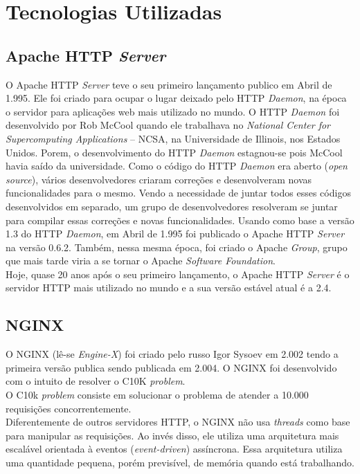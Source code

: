 \chapter{Tecnologias Utilizadas}\label{tecnologias_utilizadas}

\section{Apache HTTP \textit{Server}}
O Apache HTTP \textit{Server} teve o seu primeiro lançamento publico em Abril de 1.995. Ele foi criado para ocupar o lugar deixado pelo HTTP \textit{Daemon}, na época o servidor para aplicações web mais utilizado no mundo. O HTTP \textit{Daemon} foi desenvolvido por Rob McCool quando ele trabalhava no \textit{National Center for Supercomputing Applications} – NCSA, na Universidade de Illinois, nos Estados Unidos. Porem, o desenvolvimento do HTTP \textit{Daemon} estagnou-se pois McCool havia saído da universidade. Como o código do HTTP \textit{Daemon} era aberto (\textit{open source}), vários desenvolvedores criaram correções e desenvolveram novas funcionalidades para o mesmo. Vendo a necessidade de juntar todos esses códigos desenvolvidos em separado, um grupo de desenvolvedores resolveram se juntar para compilar essas correções e novas funcionalidades. Usando como base a versão 1.3 do HTTP \textit{Daemon}, em Abril de 1.995 foi publicado o Apache HTTP \textit{Server} na versão 0.6.2. Também, nessa mesma época, foi criado o Apache \textit{Group}, grupo que mais tarde viria a se tornar o Apache \textit{Software Foundation}.\\
Hoje, quase 20 anos após o seu primeiro lançamento, o Apache HTTP \textit{Server} é o servidor HTTP mais utilizado no mundo e a sua versão estável atual é a 2.4.\\

\section{NGINX}
O NGINX (lê-se \textit{Engine-X}) foi criado pelo russo Igor Sysoev em 2.002 tendo a primeira versão publica sendo publicada em 2.004. O NGINX foi desenvolvido com o intuito de resolver o C10K \textit{problem}.\\
O C10k \textit{problem} consiste em solucionar o problema de atender a 10.000 requisições concorrentemente.\\
Diferentemente de outros servidores HTTP, o NGINX não usa \textit{threads} como base para manipular as requisições. Ao invés disso, ele utiliza uma arquitetura mais escalável orientada à eventos (\textit{event-driven}) assíncrona. Essa arquitetura utiliza uma quantidade pequena, porém previsível, de memória quando está trabalhando.\\

